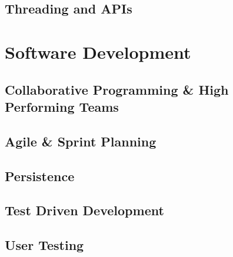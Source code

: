 \documentclass{article}
\begin{document}
\subsection{Threading and APIs}

\newpage
\section{Software Development}

\subsection{Collaborative Programming \& High Performing Teams}

\subsection{Agile \& Sprint Planning}

\subsection{Persistence}

\subsection{Test Driven Development}

\subsection{User Testing}
\end{document}
